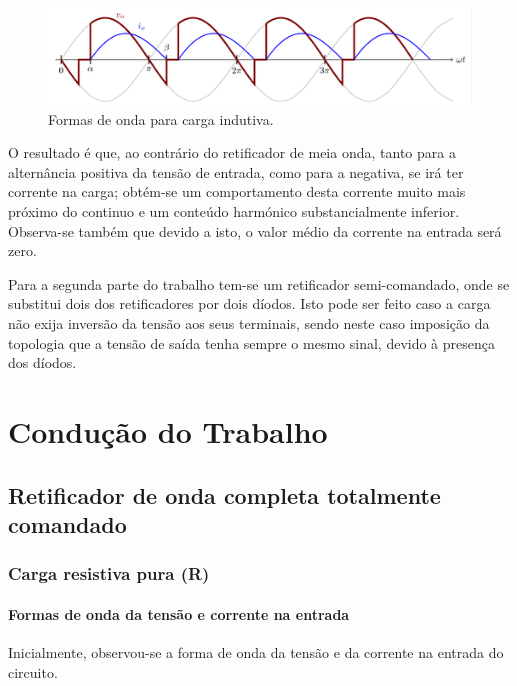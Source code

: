 \documentclass[a4paper,11pt]{article}
\numberwithin{equation}{section}
\begin{document}
\begin{figure}[h]
	\centering
	\includegraphics[keepaspectratio=true, scale=0.8]{img/andamento}
	\caption{Formas de onda para carga indutiva.}
	\label{fig:andamento}
	\vspace{-0.8em}
\end{figure}

O resultado é que, ao contrário do retificador de meia onda, tanto para a alternância positiva da tensão de entrada, como para a negativa, se irá ter corrente na carga; obtém-se um comportamento desta corrente muito mais próximo do continuo e um conteúdo harmónico substancialmente inferior. Observa-se também que devido a isto, o valor médio da corrente na entrada será zero.

Para a segunda parte do trabalho tem-se um retificador semi-comandado, onde se substitui dois dos retificadores por dois díodos. Isto pode ser feito caso a carga não exija inversão da tensão aos seus terminais, sendo neste caso imposição da topologia que a tensão de saída tenha sempre o mesmo sinal, devido à presença dos díodos.


\section{Condução do Trabalho}

\subsection{Retificador de onda completa totalmente comandado}


\subsubsection{Carga resistiva pura (R)}


\paragraph{Formas de onda da tensão e corrente na entrada} 

Inicialmente, observou-se a forma de onda da tensão e da corrente na entrada do circuito.
\end{document}
